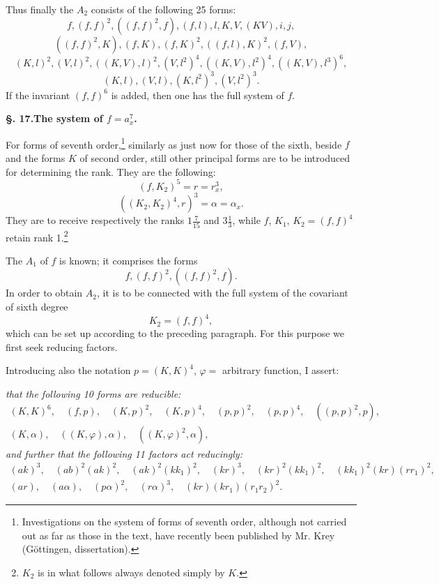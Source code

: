 \documentclass[10pt]{article}
\begin{document}
Thus finally the $A_2$ consists of the following 25 forms:
\[
f,(f,f)^2,((f,f)^2,f),(f,l),l,K,V,(KV),i,j,
\]
\[
((f,f)^2,K),(f,K),(f,K)^2,((f,l),K)^2,(f,V),
\]
\[
(K,l)^2,(V,l)^2,((K,V),l)^2,(V,l^2)^4,((K,V),l^2)^4,((K,V),l^3)^6,
\]
\[
(K,l),(V,l),(K,l^2)^3,(V,l^2)^3.
\]
If the invariant $(f,f)^6$ is added, then one has the full system of $f$.

\begin{center}
{\bfseries §. 17.\quad The system of $f=a_x^7$.}
\end{center}

For forms of seventh order,\footnote{Investigations on the system of forms of seventh order, although not carried out as far as those in the text, have recently been published by Mr. Krey (Göttingen, dissertation).} similarly as just now for those of the sixth, beside $f$ and the forms $K$ of second order, still other principal forms are to be introduced for determining the rank. They are the following:
\[
(f,K_2)^5=r=r_x^3,
\]
\[
((K_2,K_2)^4,r)^3=\alpha=\alpha_x.
\]
They are to receive respectively the ranks $1\frac7{15}$ and $3\frac13$, while $f$, $K_1$, $K_2=(f,f)^4$ retain rank 1.\footnote{$K_2$ is in what follows always denoted simply by $K$.}

The $A_1$ of $f$ is known; it comprises the forms
\[
f,(f,f)^2,((f,f)^2,f).
\]
In order to obtain $A_2$, it is to be connected with the full system of the covariant of sixth degree
\[
K_2=(f,f)^4,
\]
which can be set up according to the preceding paragraph. For this purpose we first seek reducing factors.

Introducing also the notation $p=(K,K)^4$, $\varphi=$ arbitrary function, I assert:

\textit{that the following 10 forms are reducible:}
\[
\begin{gathered}
(K,K)^6,
\quad (f,p),
\quad (K,p)^2,
\quad (K,p)^4,
\quad (p,p)^2,
\quad (p,p)^4,
\quad ((p,p)^2,p),\\
(K,\alpha),
\quad ((K,\varphi),\alpha),
\quad ((K,\varphi)^2,\alpha),
\end{gathered}
\]
\textit{and further that the following 11 factors act reducingly:}
\[
\begin{gathered}
(ak)^3,
\quad (ab)^2(ak)^2,
\quad (ak)^2(kk_1)^2,
\quad (kr)^3,
\quad (kr)^2(kk_1)^2,
\quad (kk_1)^2(kr)(rr_1)^2,\\
(ar),
\quad (a\alpha),
\quad (p\alpha)^2,
\quad (r\alpha)^3,
\quad (kr)(kr_1)(r_1r_2)^2.
\end{gathered}
\]
\end{document}
